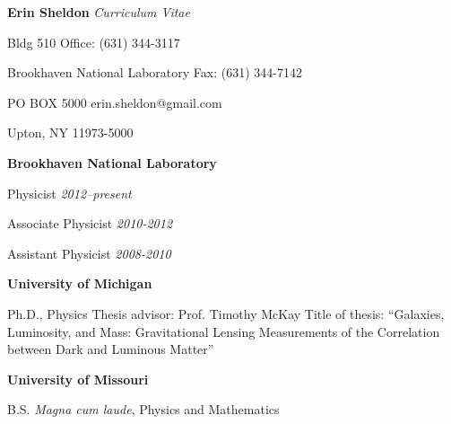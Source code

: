 \begin{center}
  {\LARGE {\bf Erin Sheldon}}
  {\large {\it Curriculum Vitae}}
\end{center}

%
%


\noindent
{Bldg 510} \hfill {Office: (631) 344-3117}

\noindent 
{Brookhaven National Laboratory} \hfill {Fax: (631) 344-7142}

\noindent
{PO BOX 5000} \hfill {erin.sheldon@gmail.com}

\noindent
{Upton, NY 11973-5000} %








\ssp
\ssp
\noindent
{}
{{\bf Brookhaven National Laboratory} }

\noindent
\makebox[1.25in][l]{}
{Physicist \hfill {\small \it 2012--present}}


\noindent
\makebox[1.25in][l]{}
{Associate Physicist \hfill {\small \it 2010-2012}}

\noindent
\makebox[1.25in][l]{}
{Assistant Physicist \hfill {\small \it 2008-2010}}



\ssp
\ssp
\noindent
{}
{\bf University of Michigan}
\hfill
{}
\normalsize

\tsp
\noindent
\makebox[1.25in][l]{}
\parbox{5.40in}{
Ph.D., Physics\newline
Thesis advisor: Prof. Timothy McKay\newline
Title of thesis: ``Galaxies, Luminosity, and Mass: Gravitational Lensing Measurements of the Correlation between Dark and Luminous Matter''
}

\isp
\noindent
\makebox[1.25in][l]{}
{\bf University of Missouri}
\hfill
{}
\normalsize

\tsp
\noindent
\makebox[1.25in][l]{}
\parbox{5.40in}{B.S. {\it Magna cum laude}, Physics and Mathematics}

